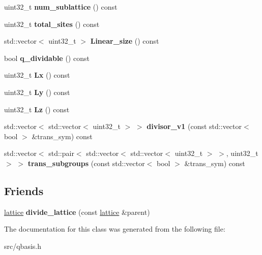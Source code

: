 \begin{DoxyCompactItemize}
uint32\+\_\+t {\bfseries num\+\_\+sublattice} () const
\item 
\mbox{\label{classqbasis_1_1lattice_aec0d584c11778ae81cea51eab0c36f83}} 
uint32\+\_\+t {\bfseries total\+\_\+sites} () const
\item 
\mbox{\label{classqbasis_1_1lattice_ae0c6cdc3a2e19bc9bfc541e61ad266d6}} 
std\+::vector$<$ uint32\+\_\+t $>$ {\bfseries Linear\+\_\+size} () const
\item 
\mbox{\label{classqbasis_1_1lattice_a07bb068b2c2e4f71ee818d367a54f783}} 
bool {\bfseries q\+\_\+dividable} () const
\item 
\mbox{\label{classqbasis_1_1lattice_aaf50768592a49b50fec7ce1d4712d98d}} 
uint32\+\_\+t {\bfseries Lx} () const
\item 
\mbox{\label{classqbasis_1_1lattice_a42571e7a367efdc3de6d39c4102cab24}} 
uint32\+\_\+t {\bfseries Ly} () const
\item 
\mbox{\label{classqbasis_1_1lattice_ad231b7fff0eb9bc057a3eb0684898f05}} 
uint32\+\_\+t {\bfseries Lz} () const
\item 
\mbox{\label{classqbasis_1_1lattice_a5d19df8eb2f05a9407b5e5075ffe5bda}} 
std\+::vector$<$ std\+::vector$<$ uint32\+\_\+t $>$ $>$ {\bfseries divisor\+\_\+v1} (const std\+::vector$<$ bool $>$ \&trans\+\_\+sym) const
\item 
\mbox{\label{classqbasis_1_1lattice_aea1167175a559718fb383c22051a3afc}} 
std\+::vector$<$ std\+::pair$<$ std\+::vector$<$ std\+::vector$<$ uint32\+\_\+t $>$ $>$, uint32\+\_\+t $>$ $>$ {\bfseries trans\+\_\+subgroups} (const std\+::vector$<$ bool $>$ \&trans\+\_\+sym) const
\end{DoxyCompactItemize}
\subsection*{Friends}
\begin{DoxyCompactItemize}
\item 
\mbox{\label{classqbasis_1_1lattice_a0721b4c19fb7b3b987b036fe163dd61d}} 
\hyperlink{classqbasis_1_1lattice}{lattice} {\bfseries divide\+\_\+lattice} (const \hyperlink{classqbasis_1_1lattice}{lattice} \&parent)
\end{DoxyCompactItemize}


The documentation for this class was generated from the following file\+:\begin{DoxyCompactItemize}
\item 
src/qbasis.\+h\end{DoxyCompactItemize}
